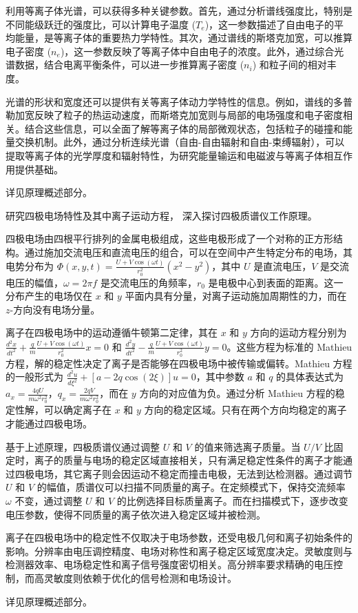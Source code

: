 利用等离子体光谱，可以获得多种关键参数。首先，通过分析谱线强度比，特别是不同能级跃迁的强度比，可以计算电子温度 (\(T_e\))，这一参数描述了自由电子的平均能量，是等离子体的重要热力学特性。其次，通过谱线的斯塔克加宽，可以推算电子密度 (\(n_e\))，这一参数反映了等离子体中自由电子的浓度。此外，通过综合光谱数据，结合电离平衡条件，可以进一步推算离子密度 (\(n_i\)) 和粒子间的相对丰度。

光谱的形状和宽度还可以提供有关等离子体动力学特性的信息。例如，谱线的多普勒加宽反映了粒子的热运动速度，而斯塔克加宽则与局部的电场强度和电子密度相关。结合这些信息，可以全面了解等离子体的局部微观状态，包括粒子的碰撞和能量交换机制。此外，通过分析连续光谱（自由-自由辐射和自由-束缚辐射），可以提取等离子体的光学厚度和辐射特性，为研究能量输运和电磁波与等离子体相互作用提供基础。

详见原理概述部分。

\begin{question}
	研究四极电场特性及其中离子运动方程， 深入探讨四极质谱仪工作原理。
\end{question}
四极电场由四根平行排列的金属电极组成，这些电极形成了一个对称的正方形结构。通过施加交流电压和直流电压的组合，可以在空间中产生特定分布的电场，其电势分布为 \(\Phi(x, y, t) = \frac{U + V \cos(\omega t)}{r_0^2} (x^2 - y^2)\)，其中 \(U\) 是直流电压，\(V\) 是交流电压的幅值，\(\omega = 2 \pi f\) 是交流电压的角频率，\(r_0\) 是电极中心到表面的距离。这一分布产生的电场仅在 \(x\) 和 \(y\) 平面内具有分量，对离子运动施加周期性的力，而在 \(z\)-方向没有电场分量。

离子在四极电场中的运动遵循牛顿第二定律，其在 \(x\) 和 \(y\) 方向的运动方程分别为 \(\frac{d^2x}{dt^2} + \frac{q}{m} \frac{U + V \cos(\omega t)}{r_0^2} x = 0\) 和 \(\frac{d^2y}{dt^2} - \frac{q}{m} \frac{U + V \cos(\omega t)}{r_0^2} y = 0\)。这些方程为标准的 Mathieu 方程，解的稳定性决定了离子是否能够在四极电场中被传输或偏转。Mathieu 方程的一般形式为 \(\frac{d^2u}{d\xi^2} + \left[a - 2q \cos(2\xi)\right] u = 0\)，其中参数 \(a\) 和 \(q\) 的具体表达式为 \(a_x = \frac{4qU}{m \omega^2 r_0^2}\)，\(q_x = \frac{2qV}{m \omega^2 r_0^2}\)，而在 \(y\) 方向的对应值为负。通过分析 Mathieu 方程的稳定性解，可以确定离子在 \(x\) 和 \(y\) 方向的稳定区域。只有在两个方向均稳定的离子才能通过四极电场。

基于上述原理，四极质谱仪通过调整 \(U\) 和 \(V\) 的值来筛选离子质量。当 \(U/V\) 比固定时，离子的质量与电场的稳定区域直接相关，只有满足稳定性条件的离子才能通过四极电场，其它离子则会因运动不稳定而撞击电极，无法到达检测器。通过调节 \(U\) 和 \(V\) 的幅值，质谱仪可以扫描不同质量的离子。在定频模式下，保持交流频率 \(\omega\) 不变，通过调整 \(U\) 和 \(V\) 的比例选择目标质量离子。而在扫描模式下，逐步改变电压参数，使得不同质量的离子依次进入稳定区域并被检测。

离子在四极电场中的稳定性不仅取决于电场参数，还受电极几何和离子初始条件的影响。分辨率由电压调控精度、电场对称性和离子稳定区域宽度决定。灵敏度则与检测器效率、电场稳定性和离子信号强度密切相关。高分辨率要求精确的电压控制，而高灵敏度则依赖于优化的信号检测和电场设计。

详见原理概述部分。
